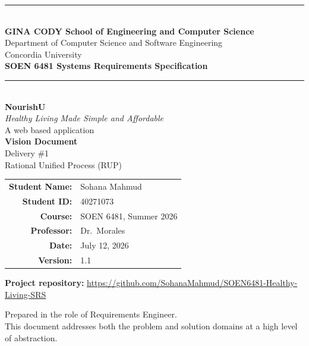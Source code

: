 \documentclass[11pt,a4paper]{article}
\newcommand{\githublink}{https://github.com/SohanaMahmud/SOEN6481-Healthy-Living-SRS}
\begin{document}
\begin{titlepage}
\centering
\vspace*{0.5cm}

{\color{concordiagold}\rule{\textwidth}{2pt}}\\[0.4cm]
{\Large\bfseries GINA CODY School of Engineering and Computer Science}\\[0.2cm]
{\large Department of Computer Science and Software Engineering}\\[0.2cm]
{\large Concordia University}\\[0.3cm]
{\large\bfseries SOEN 6481 Systems Requirements Specification}\\[0.2cm]
{\color{concordiagold}\rule{\textwidth}{2pt}}\\[1.2cm]

{\Huge\bfseries\color{nourishgreen} NourishU}\\[0.4cm]
{\LARGE\itshape Healthy Living Made Simple and Affordable}\\[0.3cm]
{\large A web based application}\\[1.0cm]

{\Large\bfseries Vision Document}\\[0.3cm]
{\large Delivery \#1}\\[0.3cm]
{\large Rational Unified Process (RUP)}\\[1.6cm]

\begin{tabular}{rl}
\textbf{Student Name:} & Sohana Mahmud \\[0.3cm]
\textbf{Student ID:} & 40271073\\[0.3cm]
\textbf{Course:} & SOEN 6481, Summer 2026 \\[0.3cm]
\textbf{Professor:}& Dr.\ Morales \\[0.3cm]
\textbf{Date:} & July 12, 2026\\[0.3cm]
\textbf{Version:} & 1.1 \\
\end{tabular}

\vspace{0.9cm}
{\footnotesize\textbf{Project repository:} \url{\githublink}}

\vfill
{\footnotesize\color{headergray} Prepared in the role of Requirements Engineer.\\
This document addresses both the problem and solution domains at a high level of abstraction.}
\end{titlepage}
\end{document}

